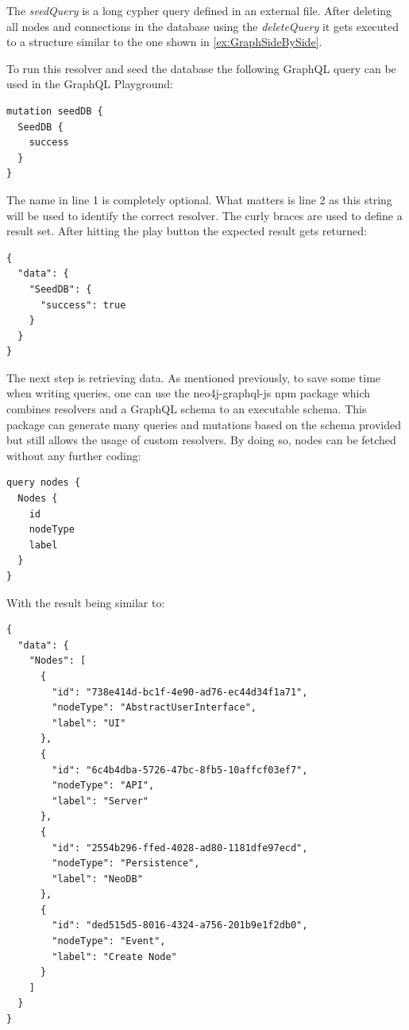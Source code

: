 The \emph{seedQuery} is a long cypher query defined in an external file. After deleting all nodes and connections in the database using the \emph{deleteQuery} it gets executed to a structure similar to the one shown in \autoref{ex:GraphSideBySide}.

To run this resolver and seed the database the following GraphQL query can be used in the GraphQL Playground:
\lstset{language=GraphQL}
\begin{lstlisting}[caption={Seeding the DB through GraphQL Playground}, label={exSeed}]
mutation seedDB {
  SeedDB {
    success
  }
}
\end{lstlisting}
The name in line 1 is completely optional. What matters is line 2 as this string will be used to identify the correct resolver. The curly braces are used to define a result set. After hitting the play button the expected result gets returned:
\begin{lstlisting}[caption={Seeding Result}, label={exResSeed}]
{
  "data": {
    "SeedDB": {
      "success": true
    }
  }
}
\end{lstlisting}

\newpage
The next step is retrieving data. As mentioned previously, to save some time when writing queries, one can use the neo4j-graphql-js npm package which combines resolvers and a GraphQL schema to an executable schema. This package can generate many queries and mutations based on the schema provided but still allows the usage of custom resolvers.
By doing so, nodes can be fetched without any further coding:

\begin{lstlisting}[caption={Fetching Nodes}, label={exFetch}]
query nodes {
  Nodes {
    id
    nodeType
    label
  }
}
\end{lstlisting}

With the result being similar to:
\begin{lstlisting}[caption={Result Set}, label={exResFetch}]
{
  "data": {
    "Nodes": [
      {
        "id": "738e414d-bc1f-4e90-ad76-ec44d34f1a71",
        "nodeType": "AbstractUserInterface",
        "label": "UI"
      },
      {
        "id": "6c4b4dba-5726-47bc-8fb5-10affcf03ef7",
        "nodeType": "API",
        "label": "Server"
      },
      {
        "id": "2554b296-ffed-4028-ad80-1181dfe97ecd",
        "nodeType": "Persistence",
        "label": "NeoDB"
      },
      {
        "id": "ded515d5-8016-4324-a756-201b9e1f2db0",
        "nodeType": "Event",
        "label": "Create Node"
      }
    ]
  }
}
\end{lstlisting}

